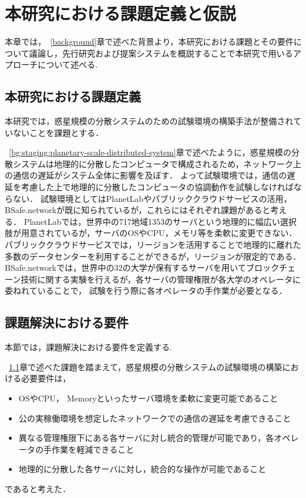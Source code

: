 \chapter{本研究における課題定義と仮説}
\label{issue}

本章では，~\ref{background}章で述べた背景より，本研究における課題とその要件について議論し，先行研究および提案システムを概説することで本研究で用いるアプローチについて述べる.

\section{本研究における課題定義}
\label{issue:definition}

本研究では，惑星規模の分散システムのための試験環境の構築手法が整備されていないことを課題とする．

~\ref{bg:staging:planetary-scale-distributed-system}章で述べたように，惑星規模の分散システムは地理的に分散したコンピュータで構成されるため，ネットワーク上の通信の遅延がシステム全体に影響を及ぼす．
よって試験環境では，通信の遅延を考慮した上で地理的に分散したコンピュータの協調動作を試験しなければならない．
試験環境としてはPlanetLabやパブリッククラウドサービスの活用，BSafe.networkが既に知られているが，これらにはそれぞれ課題があると考える．
PlanetLabでは，世界中の717地域1353のサーバという地理的に幅広い選択肢が用意されているが，サーバのOSやCPU，メモリ等を柔軟に変更できない．
パブリッククラウドサービスでは，リージョンを活用することで地理的に離れた多数のデータセンターを利用することができるが，リージョンが限定的である．
BSafe.networkでは，世界中の32の大学が保有するサーバを用いてブロックチェーン技術に関する実験を行えるが，各サーバの管理権限が各大学のオペレータに委ねれていることで，
試験を行う際に各オペレータの手作業が必要となる．

\section{課題解決における要件}
\label{issue:requirements}

本節では，課題解決における要件を定義する.

~\ref{issue:definition}章で述べた課題を踏まえて，惑星規模の分散システムの試験環境の構築における必要要件は，
\begin{itemize}
  \item OSやCPU， Memoryといったサーバ環境を柔軟に変更可能であること
  \item 公の実稼働環境を想定したネットワークでの通信の遅延を考慮できること
  \item 異なる管理権限下にある各サーバに対し統合的管理が可能であり，各オペレータの手作業を軽減できること
  \item 地理的に分散した各サーバに対し，統合的な操作が可能であること
\end{itemize}
であると考えた．

